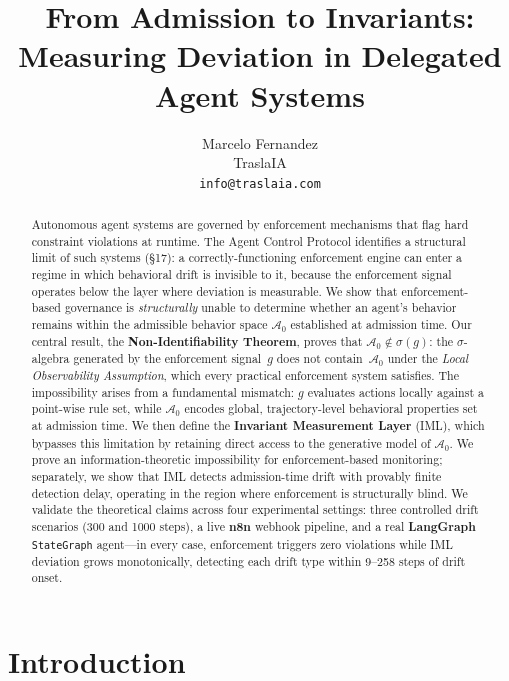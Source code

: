 \documentclass[11pt]{article}
\title{\textbf{From Admission to Invariants:}\\
       \large Measuring Deviation in Delegated Agent Systems}
\author{Marcelo Fernandez \\ \small TraslaIA \\ \small \texttt{info@traslaia.com}}
\date{}
\newcommand{\Azero}{\mathcal{A}_0}
\newcommand{\sigg}{\sigma(g)}
\begin{document}
\maketitle

\begin{abstract}
Autonomous agent systems are governed by enforcement mechanisms that flag
hard constraint violations at runtime.  The Agent Control Protocol
\citep{fernandez2026acp} identifies a structural limit of such systems
(\S17): a correctly-functioning enforcement engine can enter a regime in
which behavioral drift is invisible to it, because the enforcement signal
operates below the layer where deviation is measurable.
We show that enforcement-based governance is \emph{structurally} unable to
determine whether an agent's behavior
remains within the admissible behavior space $\Azero$ established at admission
time.  Our central result, the \textbf{Non-Identifiability Theorem}, proves
that $\Azero \notin \sigg$: the $\sigma$-algebra generated by the enforcement
signal~$g$ does not contain~$\Azero$ under the \emph{Local Observability
Assumption}, which every practical enforcement system satisfies.
The impossibility arises from a fundamental mismatch: $g$ evaluates actions
locally against a point-wise rule set, while $\Azero$ encodes global,
trajectory-level behavioral properties set at admission time.
We then define the \textbf{Invariant Measurement Layer} (IML), which bypasses
this limitation by retaining direct access to the generative model of
$\Azero$.  We prove an information-theoretic impossibility for enforcement-based
monitoring; separately, we show that IML detects admission-time drift with
provably finite detection delay, operating in the region where enforcement is
structurally blind.
We validate the theoretical claims across four experimental settings:
three controlled drift scenarios (300 and 1000 steps), a live \textbf{n8n}
webhook pipeline, and a real \textbf{LangGraph} \texttt{StateGraph} agent---in
every case, enforcement triggers zero violations while IML deviation grows
monotonically, detecting each drift type within 9--258 steps of drift onset.
\end{abstract}

\section{Introduction}
\label{sec:intro}
\end{document}
